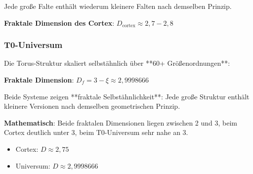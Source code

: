 	Jede große Falte enthält wiederum kleinere Falten nach demselben Prinzip.

	\textbf{Fraktale Dimension des Cortex}: $D_{\text{cortex}} \approx 2,7 - 2,8$

	\subsubsection{T0-Universum}

	Die Torus-Struktur skaliert selbstähnlich über **60+ Größenordnungen**:

	\begin{table}[h]
		\centering
		\small
		\caption{Selbstähnliche Torus-Strukturen über Skalen}
	\end{table}

	\textbf{Fraktale Dimension}: $D_f = 3 - \xi \approx 2,9998666$

	\begin{keyresult}
		Beide Systeme zeigen **fraktale Selbstähnlichkeit**: Jede große Struktur enthält kleinere Versionen nach demselben geometrischen Prinzip.

		\textbf{Mathematisch}: Beide fraktalen Dimensionen liegen zwischen 2 und 3, beim Cortex deutlich unter 3, beim T0-Universum sehr nahe an 3.
		\begin{itemize}
			\item Cortex: $D \approx 2,75$
			\item Universum: $D \approx 2,9998666$
		\end{itemize}
	\end{keyresult}


